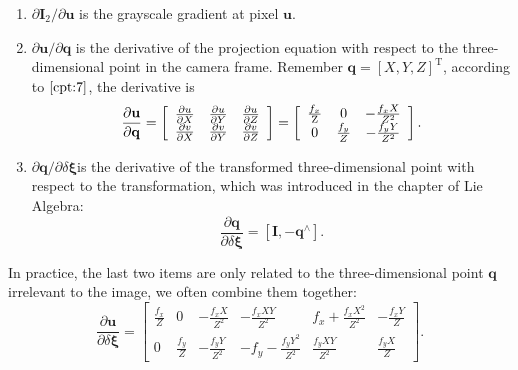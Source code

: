 \begin{enumerate}
	\item $ \partial \mathbf{I}_2 / \partial \mathbf{u} $ is the grayscale gradient at pixel $\mathbf{u}$.
	\item $ \partial \mathbf{u} / \partial \mathbf{q} $ is the derivative of the projection equation with respect to the three-dimensional point in the camera frame. Remember $\mathbf{q}=[X,Y,Z]^\mathrm{T}$, according to $\ref{cpt:7}$, the derivative is
	\begin{equation}
	\frac{{\partial \mathbf{u}}}{{\partial \mathbf{q}}} = \left[ {\begin{array}{*{20}{c}}
		{\frac{{\partial u}}{{\partial X}}}&{\frac{{\partial u}}{{\partial Y}}}&{\frac{{\partial u}}{{\partial Z}}}\\
		{\frac{{\partial v}}{{\partial X}}}&{\frac{{\partial v}}{{\partial Y}}}&{\frac{{\partial v}}{{\partial Z}}}
		\end{array}} \right] = \left[ {\begin{array}{*{20}{c}}
		{\frac{{{f_x}}}{{\rm{Z}}}}&0&{ - \frac{{{f_x}X}}{{{Z^2}}}}\\
		0&{\frac{{{f_y}}}{Z}}&{ - \frac{{{f_y}Y}}{{{Z^2}}}}
		\end{array}} \right].
	\end{equation}
	
	\item ${\partial \mathbf{q}}/{\partial \delta \mathbf{\xi} }$is the derivative of the transformed three-dimensional point with respect to the transformation, which was introduced in the chapter of Lie Algebra:
	\begin{equation}
	\frac{{\partial \mathbf{q}}}{{\partial \delta \mathbf{\xi} }} = \left[ { \mathbf{I}, - {\mathbf{q}^ \wedge }} \right].
	\end{equation}
\end{enumerate}

In practice, the last two items are only related to the three-dimensional point $\mathbf{q}$ irrelevant to the image, we often combine them together:
\begin{equation}
\frac{{\partial \mathbf{u}}}{{\partial \delta \mathbf{\xi} }} = \left[ {\begin{array}{*{20}{c}}
	{\frac{{{f_x}}}{Z}}&0&{ - \frac{{{f_x}X}}{{{Z^2}}}}&{ - \frac{{{f_x}XY}}{{{Z^2}}}}&{{f_x} + \frac{{{f_x}{X^2}}}{{{Z^2}}}}&{ - \frac{{{f_x}Y}}{Z}}\\
	0&{\frac{{{f_y}}}{Z}}&{ - \frac{{{f_y}Y}}{{{Z^2}}}}&{ - {f_y} - \frac{{{f_y}{Y^2}}}{{{Z^2}}}}&{\frac{{{f_y}XY}}{{{Z^2}}}}&{\frac{{{f_y}X}}{Z}}
	\end{array}} \right].
\end{equation}

